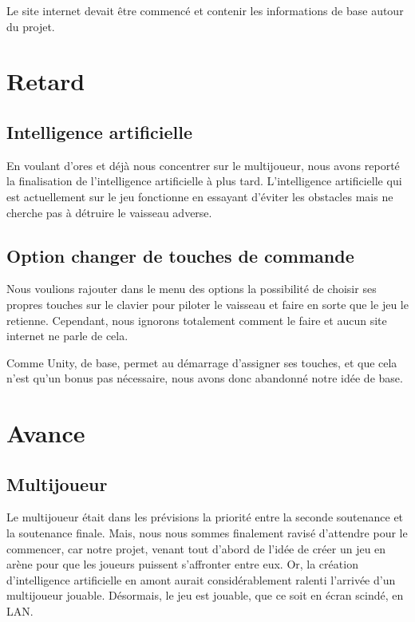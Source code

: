 \documentclass[10pt, titlepage]{report}
\begin{document}
Le site internet devait être commencé et contenir les informations de base autour du projet.\\

\section{Retard}

\subsection{Intelligence artificielle}
En voulant d'ores et déjà nous concentrer sur le multijoueur, nous avons reporté la finalisation de l'intelligence artificielle à plus tard. L'intelligence artificielle qui est actuellement sur le jeu fonctionne en essayant d'éviter les obstacles mais ne cherche pas à détruire le vaisseau adverse.\\

\subsection{Option changer de touches de commande}

Nous voulions rajouter dans le menu des options la possibilité de choisir ses propres touches sur le clavier pour piloter le vaisseau et faire en sorte que le jeu le retienne. Cependant, nous ignorons totalement comment le faire et aucun site internet ne parle de cela.

Comme Unity, de base, permet au démarrage d'assigner ses touches, et que cela n'est qu'un bonus pas nécessaire, nous avons donc abandonné notre idée de base.\\

\section{Avance}

\subsection{Multijoueur}
Le multijoueur était dans les prévisions la priorité entre la seconde soutenance et la soutenance finale. Mais, nous nous sommes finalement ravisé d'attendre pour le commencer, car notre projet, venant tout d'abord de l'idée de créer un jeu en arène pour que les joueurs puissent s'affronter entre eux. Or, la création d'intelligence artificielle en amont aurait considérablement ralenti l'arrivée d'un multijoueur jouable. Désormais, le jeu est jouable, que ce soit en écran scindé, en LAN.\\
\end{document}
